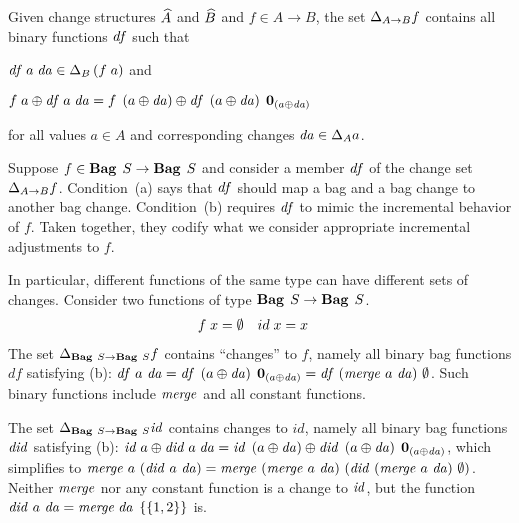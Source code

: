 
\begin{definition}
  \label{def:function-changes:change}
  Given change structures $\widehat{A}$ and $\widehat{B}$ and
  $f \in A \to B$,
  the set $\Change[A \to B]{f}$ contains all binary functions $\mathit{df}$ such that
  \begin{subdefinition}
    \item
      \label{def:function-changes:signature}
      $\App{\App{\D f}{a}}{\D a} \in \Change[B]{\App*{f}{a}}$ and
    \item
      \label{def:function-changes:validity}
      $\App{f}{a} \UPDATE \App{\App{\D f}{a}}{\D a} =
      {\App{f}{\TheNewValue}}
      \UPDATE
      \App{\App{\D f}{\TheNewValue}}{\NilC{\TheNewValue}}$
  \end{subdefinition}
  for all values $a \in A$ and corresponding changes $\D a \in
  \Change[A]{a}$.
\end{definition}

\begin{examples}
Suppose $f\in\Fun{\Bag S}{\Bag S}$ and consider a member $\mathit{df}$ of
the change set $\Change[A \to B]{f}$. Condition~(a) says that $\mathit{df}$ should map a bag and a bag change to another bag change.
Condition~(b) requires $\mathit{df}$ to mimic the incremental behavior
of $f$. Taken together, they codify what we consider appropriate
incremental adjustments to $f$.

In particular, different functions of the same type can have
different sets of changes. Consider two functions of type
$\Fun{\Bag S}{\Bag S}$.
\begin{align*}
\App{f}{x} & = \Empty & \App{\Var{id}}{x} & = x
\end{align*}
The set
$\Change[\Fun{\Bag S}{\Bag S}] f$ contains ``changes'' to $f$,
namely all binary bag functions $df$ satisfying
(b): $\D{f}~a~\D{a}=\D{f}\APP\Upd*{a}\APP\NilC{\Upd*{a}}= \D{f}~(\MERGE~a~\D{a})~\Empty$.
Such binary functions include
$\mathit{merge}$ and all constant functions.

The set $\Change[\Fun{\Bag S}{\Bag S}]\Term{id}$ contains changes to $id$,
namely all binary bag functions $\mathit{did}$ satisfying
(b):
$\Term{id}\APP a \UPDATE \D{id} \APP a \APP \D{a} =
\Term{id} \APP \Upd*{a} \UPDATE \D{id} \APP \Upd*{a} \APP
\NilC{\Upd*{a}}$, which simplifies to
$\MERGE~a~(\D{id}~a~\D{a})=
\MERGE~(\MERGE~a~\D{a})~(\D{id}~(\MERGE~a~\D{a})~\Empty)$.
Neither $\mathit{merge}$ nor any constant function is a change to
$\mathit{id}$,
but the function
$
\D{id}~a~\D a = \Merge{\D a}{\Set{1,2}}
$ is.
\end{examples}

